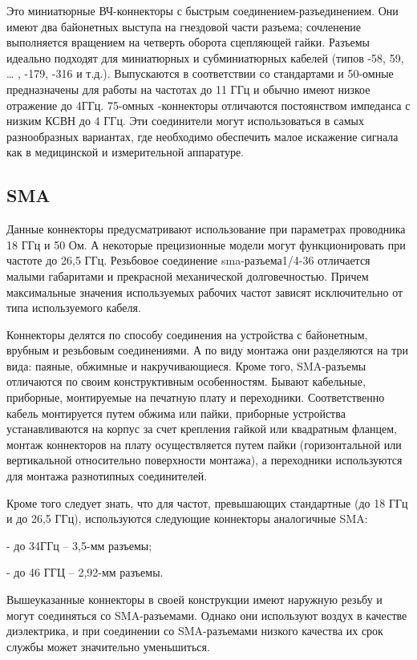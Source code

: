 \documentclass[%
	11pt,
	a4paper,
	utf8,
		]{article}
\begin{document}
Это миниатюрные ВЧ-коннекторы с быстрым соединением-разъединением. Они имеют два байонетных выступа на гнездовой части разъема; сочленение
выполняется вращением на четверть оборота сцепляющей гайки. Разъемы идеально подходят
для миниатюрных и субминиатюрных кабелей (типов -58, 59, … , -179, -316 и т.д.).
Выпускаются в соответствии со стандартами и
50-омные предназначены для работы на частотах до 11 ГГц и обычно имеют низкое
отражение до 4ГГц. 75-омных -коннекторы отличаются постоянством импеданса с низким
КСВН до 4 ГГц. Эти соединители могут использоваться в самых разнообразных вариантах, где
необходимо обеспечить малое искажение сигнала как в медицинской и
измерительной аппаратуре.

\subsection{SMA}

Данные коннекторы предусматривают использование при параметрах проводника 18 ГГц и 50 Ом. А некоторые прецизионные модели могут функционировать при частоте до 26,5 ГГц. Резьбовое соединение sma-разъема1/4-36 отличается малыми габаритами и прекрасной механической долговечностью. Причем максимальные значения используемых рабочих частот зависят исключительно от типа используемого кабеля.

Коннекторы делятся по способу соединения на устройства с байонетным, врубным и резьбовым соединениями. А по виду монтажа они разделяются на три вида: паяные, обжимные и накручивающиеся. Кроме того, SMA-разъемы отличаются по своим конструктивным особенностям. Бывают кабельные, приборные, монтируемые на печатную плату и переходники. Соответственно кабель монтируется путем обжима или пайки, приборные устройства устанавливаются на корпус за счет крепления гайкой или квадратным фланцем, монтаж коннекторов на плату осуществляется путем пайки (горизонтальной или вертикальной относительно поверхности монтажа), а переходники используются для монтажа разнотипных соединителей.

Кроме того следует знать, что для частот, превышающих стандартные (до 18 ГГц и до 26,5 ГГц), используются следующие коннекторы аналогичные SMA:

- до 34ГГц – 3,5-мм разъемы;

- до 46 ГГЦ – 2,92-мм разъемы.

Вышеуказанные коннекторы в своей конструкции имеют наружную резьбу и могут соединяться со SMA-разъемами. Однако они используют воздух в качестве диэлектрика, и при соединении со SMA-разъемами низкого качества их срок службы может значительно уменьшиться.
\end{document}

